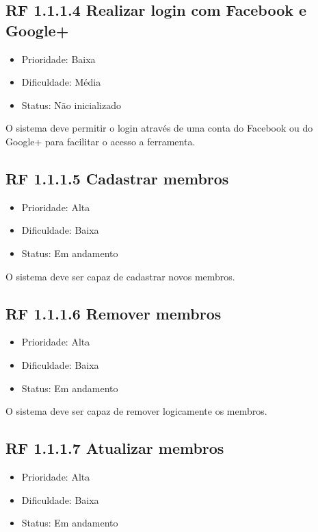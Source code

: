 \subsection{RF 1.1.1.4 Realizar login com Facebook e Google+}

\begin{itemize}
  \item{Prioridade: Baixa}
  \item{Dificuldade: Média}
  \item{Status: Não inicializado}
\end{itemize}

O sistema deve permitir o login através de uma conta do Facebook ou do Google+ para facilitar o acesso a ferramenta.


\subsection{RF 1.1.1.5 Cadastrar membros}

\begin{itemize}
  \item{Prioridade: Alta}
  \item{Dificuldade: Baixa}
  \item{Status: Em andamento}
\end{itemize}

O sistema deve ser capaz de cadastrar novos membros.


\subsection{RF 1.1.1.6 Remover membros}

\begin{itemize}
  \item{Prioridade: Alta}
  \item{Dificuldade: Baixa}
  \item{Status: Em andamento}
\end{itemize}

O sistema deve ser capaz de remover logicamente os membros.


\subsection{RF 1.1.1.7 Atualizar membros}

\begin{itemize}
  \item{Prioridade: Alta}
  \item{Dificuldade: Baixa}
  \item{Status: Em andamento}
\end{itemize}

